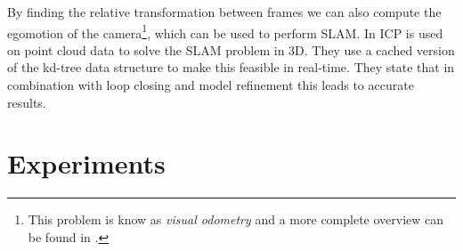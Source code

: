 \documentclass[a4paper]{article}
\begin{document}

By finding the relative transformation between frames we can also compute the egomotion of the camera\footnote{This problem is know as \emph{visual odometry} and a more complete overview can be found in \cite{scaramuzzavisual}.}, which can be used to perform \acf{SLAM}. In \cite{nuchter20076d} \ac{ICP} is used on point cloud data to solve the \ac{SLAM} problem in 3D. They use a cached version of the kd-tree data structure to make this feasible in real-time. They state that in combination with loop closing and model refinement this leads to accurate results.







\section{Experiments}
\end{document}

